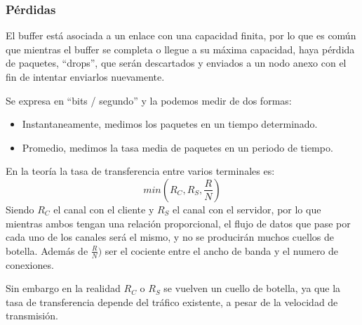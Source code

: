 \subsubsection{Pérdidas}
\noindent El buffer está asociada a un enlace con una capacidad finita, por lo que es común que mientras el buffer se completa o llegue a su máxima capacidad, haya pérdida de paquetes, ``drops'', que serán descartados y enviados a un nodo anexo con el fin de intentar enviarlos nuevamente.
\par \vspace{.5cm}
\noindent Se expresa en ``bits / segundo'' y la podemos medir de dos formas:
\begin{itemize}
        \item Instantaneamente, medimos los paquetes en un tiempo determinado.
        \item Promedio, medimos la tasa media de paquetes en un periodo de tiempo.
\end{itemize}
\noindent En la teoría la tasa de transferencia entre varios terminales es:
\[
        \boxed{min(R_C,R_S, \frac{R}{N})}
\]
\noindent Siendo \(R_C\) el canal con el cliente y \(R_S\) el canal con el servidor, por lo que mientras ambos tengan una relación proporcional, el flujo de datos que pase por cada uno de los canales será el mismo, y no se producirán muchos cuellos de botella. Además de \(\frac{R}{N})\) ser el cociente entre el ancho de banda y el numero de conexiones.\par
\noindent Sin embargo en la realidad \(R_C\) o \(R_S\) se vuelven un cuello de botella, ya que la tasa de transferencia depende del tráfico existente, a pesar de la velocidad de transmisión.
